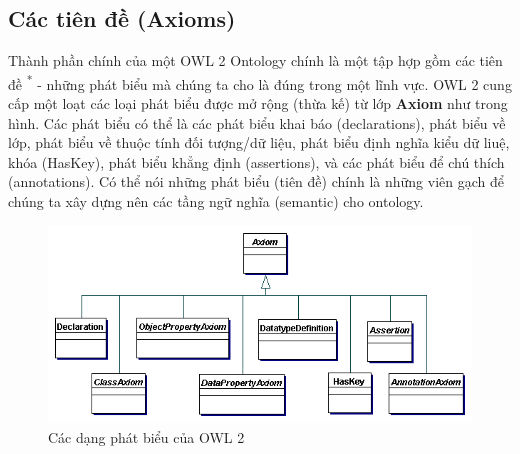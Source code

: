 \subsection{Các tiên đề (Axioms)}
{\let\thefootnote\relax{}
}
Thành phần chính của một OWL 2 Ontology chính là một tập hợp gồm các tiên đề \textsuperscript{*} - những phát biểu mà chúng ta cho là đúng trong một lĩnh vực. OWL 2 cung cấp một loạt các loại phát biểu được mở rộng (thừa kế) từ lớp \textbf{Axiom} như trong hình. Các phát biểu có thể là các phát biểu khai báo (declarations), phát biểu về lớp, phát biểu về thuộc tính đối tượng/dữ liệu, phát biểu định nghĩa kiểu dữ liuệ, khóa (HasKey), phát biểu khẳng định (assertions), và các phát biểu để chú thích (annotations). Có thể nói những phát biểu (tiên đề) chính là những viên gạch để chúng ta xây dựng nên các tầng ngữ nghĩa (semantic) cho ontology.
\begin{figure}[!h]
	\centering
	\includegraphics[width=150mm]{Figures/axioms.png}
	\caption{Các dạng phát biểu của OWL 2\label{overflow}}
\end{figure}

